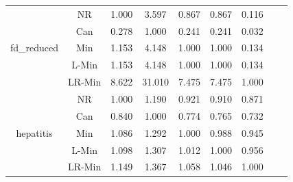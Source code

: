 \documentclass[11pt]{book}
\begin{document}
\begin{table}
\begin{tabular}{|c|c|c|c|c|c|c|c|c|}
    \hline
    \multirow{5}{*}{fd\_reduced}
         & NR & 1.000 & 3.597 & 0.867 & 0.867 & 0.116 \\                                                                                                                                                             
         & Can & 0.278 & 1.000 & 0.241 & 0.241 & 0.032 \\                                                                                                                                                            
         & Min & 1.153 & 4.148 & 1.000 & 1.000 & 0.134 \\                                                                                                                                                            
         & L-Min & 1.153 & 4.148 & 1.000 & 1.000 & 0.134 \\                                                                                                                                                          
         & LR-Min & 8.622 & 31.010 & 7.475 & 7.475 & 1.000 \\
    
    \hline
    \multirow{5}{*}{hepatitis}
         & NR & 1.000 & 1.190 & 0.921 & 0.910 & 0.871 \\                                                                                                                                                             
         & Can & 0.840 & 1.000 & 0.774 & 0.765 & 0.732 \\                                                                                                                                                            
         & Min & 1.086 & 1.292 & 1.000 & 0.988 & 0.945 \\                                                                                                                                                            
         & L-Min & 1.098 & 1.307 & 1.012 & 1.000 & 0.956 \\                                                                                                                                                          
         & LR-Min & 1.149 & 1.367 & 1.058 & 1.046 & 1.000 \\
         

\end{tabular}
\end{table}
\end{document}
